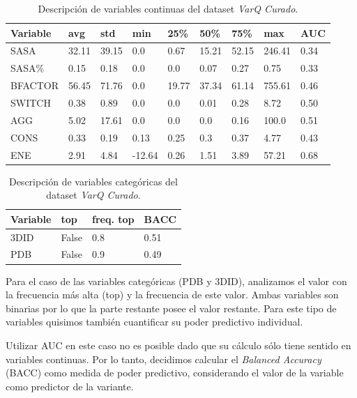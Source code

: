 \begin{table}[H]
\centering
\begin{tabular}{|l|l|l|l|l|l|l|l|l|}
\hline
Variable & avg  & std   & min    & 25\%  & 50\%  & 75\%  & max & AUC\\ \hline
SASA    & 32.11 & 39.15 & 0.0    & 0.67  & 15.21 & 52.15 & 246.41 & 0.34 \\ \hline
SASA\%  & 0.15  & 0.18  & 0.0    & 0.0   & 0.07  & 0.27  & 0.75 & 0.33  \\ \hline
BFACTOR & 56.45 & 71.76 & 0.0    & 19.77 & 37.34 & 61.14 & 755.61 & 0.46 \\ \hline
SWITCH  & 0.38  & 0.89  & 0.0    & 0.0   & 0.01  & 0.28  & 8.72 &  0.50  \\ \hline
AGG     & 5.02  & 17.61 & 0.0    & 0.0   & 0.0   & 0.16  & 100.0 &  0.51\\ \hline
CONS    & 0.33  & 0.19  & 0.13   & 0.25  & 0.3   & 0.37  & 4.77 & 0.43\\ \hline
ENE     & 2.91  & 4.84  & -12.64 & 0.26  & 1.51  & 3.89 & 57.21 & 0.68\\ \hline 
\end{tabular}
\caption{Descripción de variables continuas del dataset \textit{VarQ Curado}.}
\label{tab:descripcion_varq_cont}
\end{table}

\begin{table}[H]
\centering
\begin{tabular}{|l|l|l|l|}
\hline
Variable & top  & freq. top & BACC \\ \hline
3DID    & False & 0.8 & 0.51\\ \hline
PDB  & False  & 0.9 & 0.49\\ \hline
\end{tabular}
\caption{Descripción de variables categóricas del dataset \textit{VarQ Curado}.}
\label{tab:descripcion_varq_cat}
\end{table}

Para el caso de las variables categóricas (PDB y 3DID), analizamos el valor con la frecuencia más alta (top) y la frecuencia de este valor. Ambas variables son binarias por lo que la parte restante posee el valor restante. Para este tipo de variables quisimos también cuantificar su poder predictivo individual. 

\newpage

Utilizar AUC en este caso no es posible dado que su cálculo sólo tiene sentido en variables continuas. Por lo tanto, decidimos calcular el \textit{Balanced Accuracy} (BACC) \cite{Brodersen2010} como medida de poder predictivo, considerando el valor de la variable como predictor de la variante. 

